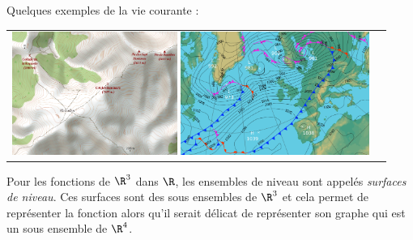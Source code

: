 \begin{exemple}
\begin{center}
\begin{tabular}{cc}
		\end{tabular}
	\end{center}
	Quelques exemples de la vie courante :
\begin{center}
	\begin{tabular}[]{cc}
		\includegraphics[height=4cm]{./figures/isohypses.png}
		\includegraphics[height=4cm]{./figures/isobar.png}
	\end{tabular}
\end{center}
\end{exemple}

Pour les fonctions de $\R^3$ dans $\R$, les ensembles de niveau sont appelés \emph{surfaces de niveau}. Ces surfaces sont des sous ensembles de $\R^3$ et cela permet de représenter la fonction alors qu'il serait délicat de représenter son graphe qui est un sous ensemble de $\R^4$.  


